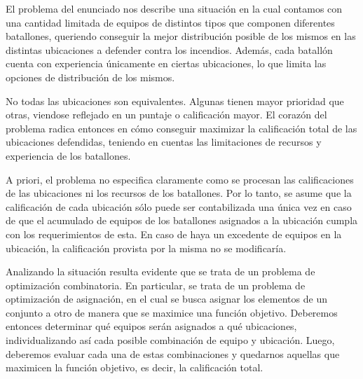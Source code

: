 El problema del enunciado nos describe una situación en la cual contamos con una cantidad
limitada de equipos de distintos tipos que componen diferentes batallones, queriendo
conseguir la mejor distribución posible de los mismos en las distintas ubicaciones
a defender contra los incendios. Además, cada batallón cuenta con experiencia únicamente
en ciertas ubicaciones, lo que limita las opciones de distribución de los mismos.

No todas las ubicaciones son equivalentes. Algunas tienen mayor prioridad que otras,
viendose reflejado en un puntaje o calificación mayor. El corazón del problema radica entonces
en cómo conseguir maximizar la calificación total de las ubicaciones defendidas, teniendo en cuentas
las limitaciones de recursos y experiencia de los batallones.

A priori, el problema no especifica claramente como se procesan las calificaciones de las ubicaciones
ni los recursos de los batallones. Por lo tanto, se asume que la calificación de cada ubicación
sólo puede ser contabilizada una única vez en caso de que el acumulado de equipos de los batallones
asignados a la ubicación cumpla con los requerimientos de esta. En caso de haya un excedente de equipos
en la ubicación, la calificación provista por la misma no se modificaría.

Analizando la situación resulta evidente que se trata de un problema de optimización combinatoria.
En particular, se trata de un problema de optimización de asignación, en el cual se busca asignar
los elementos de un conjunto a otro de manera que se maximice una función objetivo. Deberemos entonces
determinar qué equipos serán asignados a qué ubicaciones, individualizando así cada posible combinación
de equipo y ubicación. Luego, deberemos evaluar cada una de estas combinaciones y quedarnos aquellas
que maximicen la función objetivo, es decir, la calificación total.

